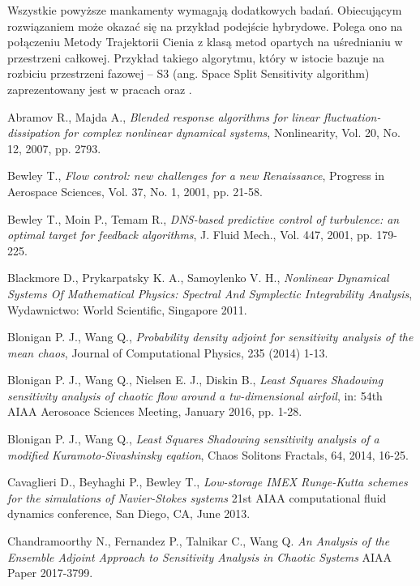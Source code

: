 \documentclass[12pt, twoside]{book}
\begin{document}
Wszystkie powyższe mankamenty wymagają dodatkowych badań. Obiecującym rozwiązaniem może okazać się na przykład podejście hybrydowe. Polega ono na połączeniu Metody Trajektorii Cienia z klasą metod opartych na uśrednianiu w przestrzeni całkowej. Przykład takiego algorytmu, który w istocie bazuje na rozbiciu przestrzeni fazowej – S3 (ang. Space Split Sensitivity algorithm) zaprezentowany jest w pracach \cite{Chandramoorthy2} oraz \cite{Chandramoorthy3}.
	  
\newpage
\begin{thebibliography}{99}

 Abramov R., Majda A.,
\emph{Blended response algorithms for linear fluctuation-dissipation for complex nonlinear dynamical systems},
Nonlinearity, Vol. 20, No. 12, 2007, pp. 2793.
	
 Bewley T.,
\emph{Flow control: new challenges for a new Renaissance},
Progress in Aerospace Sciences, Vol. 37, No. 1, 2001, pp. 21-58.

 Bewley T., Moin P., Temam R.,
\emph{DNS-based predictive control of turbulence: an optimal target for feedback algorithms},
J. Fluid Mech., Vol. 447, 2001, pp. 179-225.

 Blackmore D., Prykarpatsky K. A., Samoylenko V. H.,
\emph{Nonlinear Dynamical Systems Of Mathematical Physics: Spectral And Symplectic Integrability Analysis},
Wydawnictwo: World Scientific, Singapore 2011.

 Blonigan P. J., Wang Q.,
\emph{Probability density adjoint for sensitivity analysis of the mean chaos},
Journal of Computational Physics, 235 (2014) 1-13.

 Blonigan P. J., Wang Q., Nielsen E. J., Diskin B.,
\emph{Least Squares Shadowing sensitivity analysis of chaotic flow around a tw-dimensional airfoil},
in: 54th AIAA Aerosoace Sciences Meeting, January 2016, pp. 1-28.

 Blonigan P. J., Wang Q.,
\emph{Least Squares Shadowing sensitivity analysis of a modified Kuramoto-Sivashinsky eqation},
Chaos Solitons Fractals, 64, 2014, 16-25.

 Cavaglieri D., Beyhaghi P., Bewley T.,  
\emph{Low-storage IMEX Runge-Kutta schemes for the simulations of Navier-Stokes systems} 
21st AIAA computational fluid dynamics conference, San Diego, CA, June 2013.

 Chandramoorthy N., Fernandez P., Talnikar C., Wang Q. 
\emph{An Analysis of the Ensemble Adjoint Approach to Sensitivity Analysis in Chaotic Systems} 
AIAA Paper 2017-3799. 


\end{thebibliography}
\end{document}
